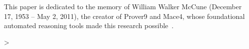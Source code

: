 \begin{acks}
This paper is dedicated to the memory of William Walker McCune (December 17, 1953 -- May 2, 2011), the creator of Prover9 and Mace4, whose foundational automated reasoning tools made this research possible~\cite{bonacina2013automated}.
\end{acks}

%
%
%
\FloatBarrier
\label{ddc:beforebib}%
\ifnum{}>\relax
  \clearpage\balance
\fi





